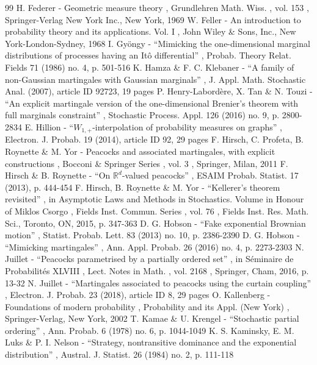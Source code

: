 \documentclass[11pt]{article}
\theoremstyle{plain}
\theoremstyle{definition}
\begin{document}
\begin{thebibliography}{99}
 H. Federer - Geometric measure theory , Grundlehren Math. Wiss. , vol. 153 , Springer-Verlag New York Inc., New York, 1969
 W. Feller - An introduction to probability theory and its applications. Vol. I , John Wiley \& Sons, Inc., New York-London-Sydney, 1968
 I. Gyöngy - “Mimicking the one-dimensional marginal distributions of processes having an Itô differential” , Probab. Theory Relat. Fields 71 (1986) no. 4, p. 501-516
 K. Hamza \& F. C. Klebaner - “A family of non-Gaussian martingales with Gaussian marginals” , J. Appl. Math. Stochastic Anal. (2007), article ID 92723, 19 pages
 P. Henry-Labordère, X. Tan \& N. Touzi - “An explicit martingale version of the one-dimensional Brenier’s theorem with full marginals constraint” , Stochastic Process. Appl. 126 (2016) no. 9, p. 2800-2834
 E. Hillion - “$W_{1,+}$-interpolation of probability measures on graphs” , Electron. J. Probab. 19 (2014), article ID 92, 29 pages
 F. Hirsch, C. Profeta, B. Roynette \& M. Yor - Peacocks and associated martingales, with explicit constructions , Bocconi \& Springer Series , vol. 3 , Springer, Milan, 2011
 F. Hirsch \& B. Roynette - “On $\mathbb{R}^d$-valued peacocks” , ESAIM Probab. Statist. 17 (2013), p. 444-454
 F. Hirsch, B. Roynette \& M. Yor - “Kellerer’s theorem revisited” , in Asymptotic Laws and Methods in Stochastics. Volume in Honour of Miklos Csorgo , Fields Inst. Commun. Series , vol. 76 , Fields Inst. Res. Math. Sci., Toronto, ON, 2015, p. 347-363
 D. G. Hobson - “Fake exponential Brownian motion” , Statist. Probab. Lett. 83 (2013) no. 10, p. 2386-2390
 D. G. Hobson - “Mimicking martingales” , Ann. Appl. Probab. 26 (2016) no. 4, p. 2273-2303
 N. Juillet - “Peacocks parametrised by a partially ordered set” , in Séminaire de Probabilités XLVIII , Lect. Notes in Math. , vol. 2168 , Springer, Cham, 2016, p. 13-32
 N. Juillet - “Martingales associated to peacocks using the curtain coupling” , Electron. J. Probab. 23 (2018), article ID 8, 29 pages
 O. Kallenberg - Foundations of modern probability , Probability and its Appl. (New York) , Springer-Verlag, New York, 2002
 T. Kamae \& U. Krengel - “Stochastic partial ordering” , Ann. Probab. 6 (1978) no. 6, p. 1044-1049
 K. S. Kaminsky, E. M. Luks \& P. I. Nelson - “Strategy, nontransitive dominance and the exponential distribution” , Austral. J. Statist. 26 (1984) no. 2, p. 111-118

\end{thebibliography}
\end{document}
